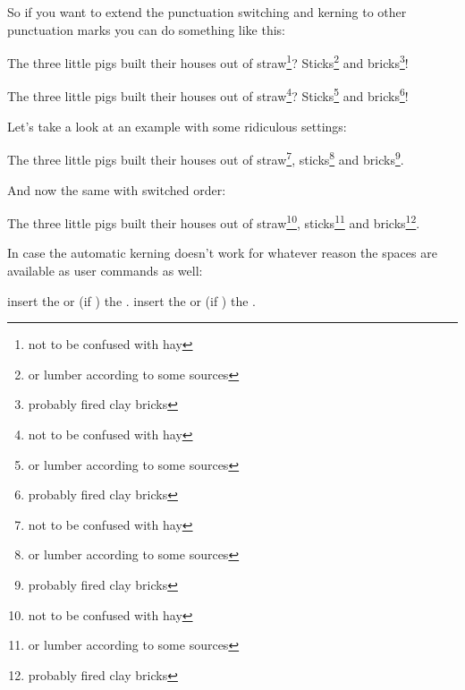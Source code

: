 \documentclass[toc=index,toc=bib]{cnpkgdoc}
\begin{document}
So if you want to extend the punctuation switching and kerning to other punctuation
marks you can do something like this:
\begin{beispiel}
 \begin{minipage}{.4\linewidth}
  \noindent The three little pigs built their houses
  out of straw\footnote{not to be confused with hay}?
  Sticks\footnote{or lumber according to some sources}
  and bricks\footnote{probably fired clay bricks}!
 \end{minipage}
\end{beispiel}

\begin{beispiel}
 \begin{minipage}{.4\linewidth}
  \noindent The three little pigs built their houses
  out of straw\footnote{not to be confused with hay}?
  Sticks\footnote{or lumber according to some sources}
  and bricks\footnote{probably fired clay bricks}!
 \end{minipage}
\end{beispiel}

Let's take a look at an example with some ridiculous settings:
\begin{beispiel}
 \begin{minipage}{.4\linewidth}
  \noindent The three little pigs built their houses
  out of straw\footnote{not to be confused with hay},
  sticks\footnote{or lumber according to some sources}
  and bricks\footnote{probably fired clay bricks}.
 \end{minipage}
\end{beispiel}

And now the same with switched order:
\begin{beispiel}
 \begin{minipage}{.4\linewidth}
  \noindent The three little pigs built their houses
  out of straw\footnote{not to be confused with hay},
  sticks\footnote{or lumber according to some sources}
  and bricks\footnote{probably fired clay bricks}.
 \end{minipage}
\end{beispiel}

In case the automatic kerning doesn't work for whatever reason the spaces are
available as user commands as well:
\begin{beschreibung}
  insert the  or (if )
 the .
  insert the  or (if )
 the .
\end{beschreibung}
\end{document}
